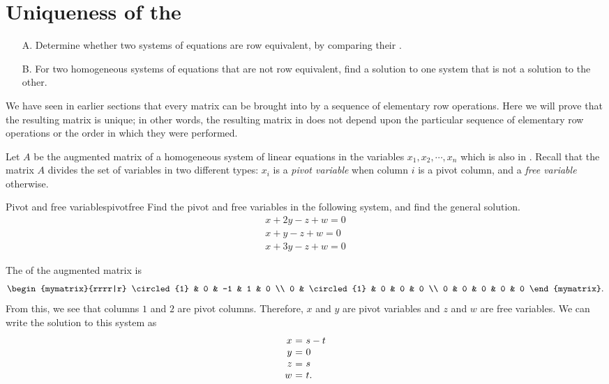 \section{Uniqueness of the {\rref}}

\begin{outcome}
  \begin{enumerate}
  \item[A.] Determine whether two systems of equations are row
    equivalent, by comparing their {\rref}.
    
  \item[B.] For two homogeneous systems of equations that are not row
    equivalent, find a solution to one system that is not a solution
    to the other.
  \end{enumerate}
\end{outcome}

We have seen in earlier sections that every matrix can be brought into
{\rref} by a sequence of elementary row operations. Here we will prove
that the resulting matrix is unique; in other words, the resulting
matrix in {\rref} does not depend upon the particular sequence of
elementary row operations or the order in which they were performed.

Let $A$ be the augmented matrix of a homogeneous system of linear
equations in the variables $x_1, x_2, \cdots, x_n$ which is also in
{\rref}. Recall that the matrix $A$ divides the set of variables in
two different types: $x_i$ is a
{\em pivot variable} when column $i$ is a pivot
column, and a {\em free variable} otherwise.

\begin{example}{Pivot and free variables}{pivotfree}
Find the pivot and free variables in the following system, and find
the general solution.
\[
\begin{array}{c}
x+2y-z+w=0 \\
x+y-z+w=0 \\
x+3y-z+w=0
\end{array}
\]
\end{example}

\begin{solution}
The {\rref} of the augmented matrix is
\[
\begin{mymatrix}{rrrr|r}
\circled{1} & 0 & -1 & 1 & 0 \\
0 & \circled{1} & 0 & 0 & 0 \\
0 & 0 & 0 & 0 & 0
\end{mymatrix}.
\]
From this, we see that columns $1$ and $2$ are pivot
columns. Therefore, $x$ and $y$ are pivot variables and $z$ and $w$
are free variables. We can write the solution to this system as
\[
\begin{array}{r@{~}c@{~}l}
x &=& s-t \\
y &=& 0 \\
z &=& s \\
w &=& t.
\end{array}
\]
\end{solution}

